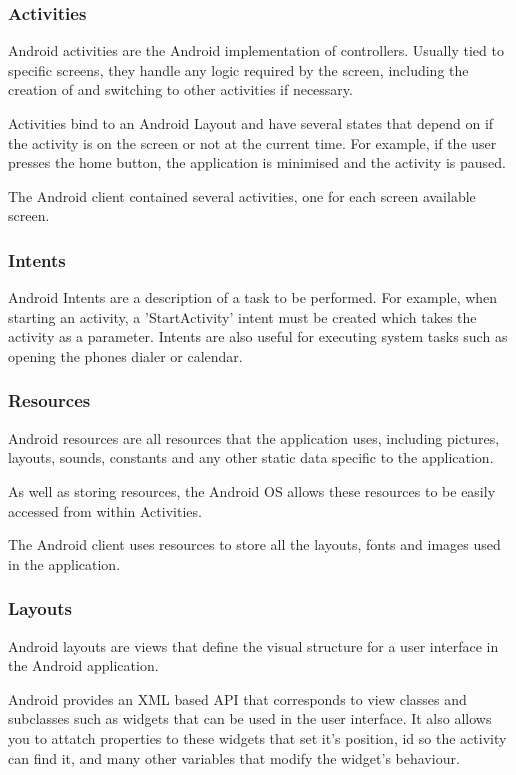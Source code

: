 \subsubsection{Activities}

Android activities are the Android implementation of controllers. Usually tied to specific screens, they handle any logic required by the screen, including the creation of and switching to other activities if necessary.

Activities bind to an Android Layout and have several states that depend on if the activity is on the screen or not at the current time. For example, if the user presses the home button, the application is minimised and the activity is paused.

The Android client contained several activities, one for each screen available screen.

\subsubsection{Intents}

Android Intents are a description of a task to be performed. For example, when starting an activity, a 'StartActivity' intent must be created which takes the activity as a parameter. Intents are also useful for executing system tasks such as opening the phones dialer or calendar.

\subsubsection{Resources}

Android resources are all resources that the application uses, including pictures, layouts, sounds, constants and any other static data specific to the application.

As well as storing resources, the Android OS allows these resources to be easily accessed from within Activities.

The Android client uses resources to store all the layouts, fonts and images used in the application.

\subsubsection{Layouts}

Android layouts are views that define the visual structure for a user interface in the Android application.

Android provides an XML based API that corresponds to view classes and subclasses such as widgets that can be used in the user interface. It also allows you to attatch properties to these widgets that set it's position, id so the activity can find it, and many other variables that modify the widget's behaviour.

